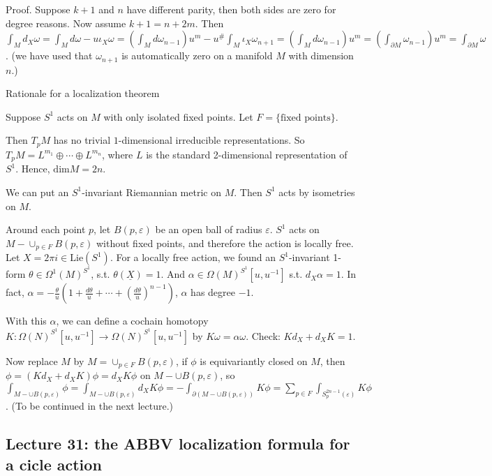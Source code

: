 \documentclass{article}
\theoremstyle{mystyle}
\theoremstyle{remark}
\numberwithin{equation}{section}
\begin{document}
Proof. Suppose $k+1$ and $n$ have different parity, then both sides are zero for degree reasons. Now assume $k+1 = n+2m$. Then $\int_M d_X\omega = \int_M d\omega - u \iota_X\omega = \left(\int_M d\omega_{n-1}\right)u^m  - u^\# \int_M \iota_X \omega_{n+1} = \left(\int_M d\omega_{n-1}\right)u^m  = \left(\int_{\partial M} \omega_{n-1}\right) u^m = \int_{\partial M} \omega$.  (we have used that $\omega_{n+1}$ is automatically zero on a manifold $M$ with dimension $n$.)




Rationale for a localization theorem

Suppose $S^1$ acts on $M$ with only isolated fixed points. Let $F = \{\text{fixed points}\}$. 

Then $T_pM$ has no trivial $1$-dimensional irreducible representations. So $T_pM = L^{m_1}\oplus \cdots \oplus L^{m_n}$, where $L$ is the standard 2-dimensional representation of $S^1$. Hence, $\mathrm{dim}M = 2n$. 


We can put an $S^1$-invariant Riemannian metric on $M$. Then $S^1$ acts by isometries on $M$.

Around each point $p$, let $B(p,\varepsilon)$ be an open ball of radius $\varepsilon$.  $S^1$ acts on $M-\cup_{p\in F} B(p,\varepsilon)$ without fixed points, and therefore the action is locally free. Let $X = 2\pi i \in \mathrm{Lie}(S^1)$.  For a locally free action, we found an $S^1$-invariant 1-form $\theta \in \Omega^1(M)^{S^1}$, s.t. $\theta(\underline{X}) = 1$. And $\alpha \in \Omega(M)^{S^1}[u,u^{-1}]$ s.t. $d_X\alpha = 1$. In fact, $\alpha = - \frac{\theta}{u} \left(1 + \frac{d\theta}{u} + \cdots + \left(\frac{d \theta}{u}\right)^{n-1}\right)$, $\alpha$ has degree $-1$.

With this $\alpha$, we can define a cochain homotopy $K\colon \Omega(N)^{S^1}[u,u^{-1}]
\rightarrow \Omega(N)^{S^1}[u,u^{-1}]
$ by $K\omega = \alpha \omega$. Check: $Kd_X + d_XK = 1$.

Now replace $M$ by $M = \cup_{p\in F} B(p,\varepsilon)$, if $\phi$ is equivariantly closed on $M$, then $\phi = (Kd_X+d_XK)\phi = d_X K\phi $ on $M - \cup B(p,\varepsilon)$,  so $\int_{M-\cup B(p,\varepsilon)} \phi
= \int_{M-\cup B(p,\varepsilon)} d_XK\phi
 = -\int _{\partial(M-\cup B(p,\varepsilon))} K\phi = \sum_{p \in F} \int_{S^{2n-1}_p (\varepsilon)} K \phi$. (To be continued in the next lecture.)




\subsection{Lecture 31: the ABBV localization formula for a cicle action}
\end{document}
